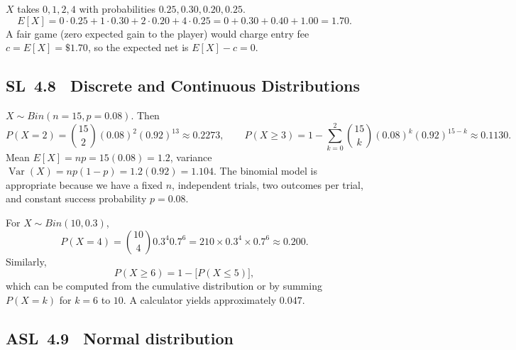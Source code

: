 \documentclass[11pt]{article}
\def\mathrm#1{#1}%
\newcommand{\tocsubsection}[1]{\subsection{#1}}
\begin{document}
\begin{solution}
$X$ takes $0,1,2,4$ with probabilities $0.25,0.30,0.20,0.25$.
\[
E[X]=0\cdot0.25+1\cdot0.30+2\cdot0.20+4\cdot0.25=0+0.30+0.40+1.00=1.70.
\]
A fair game (zero expected gain to the player) would charge entry fee $c=E[X]=\$1.70$, so the expected net is $E[X]-c=0$.
\end{solution}





\tocsubsection{SL 4.8 \; Discrete and Continuous Distributions}

\begin{solution}
$X\sim\mathrm{Bin}(n=15,p=0.08)$. Then
\[
P(X=2)=\binom{15}{2}(0.08)^2(0.92)^{13}\approx 0.2273,\qquad
P(X\ge 3)=1-\sum_{k=0}^{2}\binom{15}{k}(0.08)^k(0.92)^{15-k}\approx 0.1130.
\]
Mean $E[X]=np=15(0.08)=1.2$, variance $\operatorname{Var}(X)=np(1-p)=1.2(0.92)=1.104$. The binomial model is appropriate because we have a fixed $n$, independent trials, two outcomes per trial, and constant success probability $p=0.08$.
\end{solution}






\begin{solution}
For $X\sim\mathrm{Bin}(10,0.3)$,
\[P(X=4)=\binom{10}{4}0.3^4 0.7^6=210\times0.3^4\times0.7^6\approx0.200.
\]
Similarly,
\[P(X\ge6)=1-\bigl[P(X\le5)\bigr],
\]
which can be computed from the cumulative distribution or by summing
$P(X=k)$ for $k=6$ to $10$.  A calculator yields approximately $0.047$.
\end{solution}

\tocsubsection{ASL 4.9 \; Normal distribution}

\end{document}
